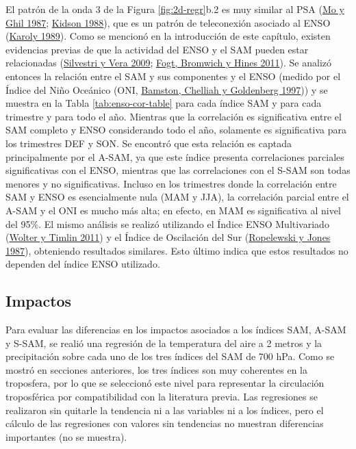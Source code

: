 \documentclass[12pt,oneside,a4paper]{reedthesis}
\begin{document}
El patrón de la onda 3 de la Figura \ref{fig:2d-regr}b.2 es muy similar al PSA (\protect\hyperlink{ref-mo1987}{Mo y Ghil 1987}; \protect\hyperlink{ref-kidson1988}{Kidson 1988}), que es un patrón de teleconexión asociado al ENSO (\protect\hyperlink{ref-karoly1989}{Karoly 1989}).
Como se mencionó en la introducción de este capítulo, existen evidencias previas de que la actividad del ENSO y el SAM pueden estar relacionadas (\protect\hyperlink{ref-silvestri2009}{Silvestri y Vera 2009}; \protect\hyperlink{ref-fogt2011a}{Fogt, Bromwich y Hines 2011}).
Se analizó entonces la relación entre el SAM y sus componentes y el ENSO (medido por el Índice del Niño Oceánico (ONI, \protect\hyperlink{ref-bamston1997}{Bamston, Chelliah y Goldenberg 1997})) y se muestra en la Tabla \ref{tab:enso-cor-table} para cada índice SAM y para cada trimestre y para todo el año.
Mientras que la correlación es significativa entre el SAM completo y ENSO considerando todo el año, solamente es significativa para los trimestres DEF y SON.
Se encontró que esta relación es captada principalmente por el A-SAM, ya que este índice presenta correlaciones parciales significativas con el ENSO, mientras que las correlaciones con el S-SAM son todas menores y no significativas.
Incluso en los trimestres donde la correlación entre SAM y ENSO es esencialmente nula (MAM y JJA), la correlación parcial entre el A-SAM y el ONI es mucho más alta; en efecto, en MAM es significativa al nivel del 95\%.
El mismo análisis se realizó utilizando el Índice ENSO Multivariado (\protect\hyperlink{ref-wolter2011}{Wolter y Timlin 2011}) y el Índice de Oscilación del Sur (\protect\hyperlink{ref-ropelewski1987}{Ropelewski y Jones 1987}), obteniendo resultados similares.
Esto último indica que estos resultados no dependen del índice ENSO utilizado.

\hypertarget{impacts}{%
\subsection{Impactos}\label{impacts}}

Para evaluar las diferencias en los impactos asociados a los índices SAM, A-SAM y S-SAM, se realió una regresión de la temperatura del aire a 2 metros y la precipitación sobre cada uno de los tres índices del SAM de 700 hPa.
Como se mostró en secciones anteriores, los tres índices son muy coherentes en la troposfera, por lo que se seleccionó este nivel para representar la circulación troposférica por compatibilidad con la literatura previa.
Las regresiones se realizaron sin quitarle la tendencia ni a las variables ni a los índices, pero el cálculo de las regresiones con valores sin tendencias no muestran diferencias importantes (no se muestra).
\end{document}
